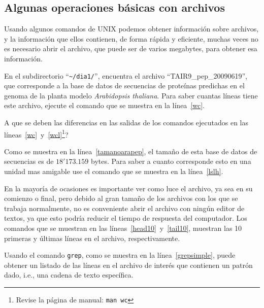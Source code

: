 \documentclass[letter,11pt]{book}
\begin{document}
\subsection{Algunas operaciones básicas con archivos}
Usando algunos comandos de UNIX podemos obtener información sobre archivos, y la información que ellos contienen,  de forma rápida y eficiente, muchas veces no es necesario abrir el archivo, que puede ser de varios megabytes, para obtener esa información.

En el subdirectorio ``\Verb+~/dia1/+'', encuentra el archivo ``TAIR9\_pep\_20090619'', que corresponde a la base de datos de secuencias de proteínas predichas en el genoma de la planta modelo \textit{Arabidopsis thaliana}. Para saber cuantas líneas tiene este archivo, ejecute el comando que se muestra en la línea~\ref{wc}.

{\textquestiondown}A que se deben las diferencias en las salidas de los comandos ejecutados en las líneas~\ref{wc}~y~\ref{wcl}\footnote{Revise la página de manual: \Verb+man wc+}?

Como se muestra en la línea~\ref{tamanoarapep}, el tamaño de esta base de datos de secuencias es de $18'173.159$ bytes. Para saber a cuanto corresponde esto en una unidad mas amigable use el comando que se muestra en la línea~\ref{lslh}.

En la mayoría de ocasiones es importante ver como luce el archivo, ya sea en su comienzo o final, pero debido al gran tamaño de los archivos con los que se trabaja normalmente, no es conveniente abrir el archivo con ningún editor de textos, ya que esto podría reducir el tiempo de respuesta del computador.  Los comandos que se muestran en las líneas~\ref{head10}~y~\ref{tail10}, muestran las 10 primeras y últimas líneas en el archivo, respectivamente.

Usando el comando \Verb+grep+, como se muestra en la línea~\ref{grepsimple}, puede obtener un listado de las líneas en el archivo de interés que contienen un patrón dado, i.e., una cadena de texto específica.
\end{document}

